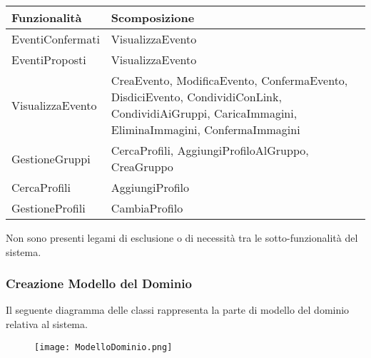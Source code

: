 \begin{tabular} {|P{7.3cm}|P{8cm}|}
    \hline
    \textbf{Funzionalità} & \textbf{Scomposizione}                                                                                                                            \\
    \hline
    EventiConfermati      & VisualizzaEvento                                                                                                                                  \\
    \hline
    EventiProposti        & VisualizzaEvento                                                                                                                                  \\
    \hline
    VisualizzaEvento      & CreaEvento, ModificaEvento, ConfermaEvento, DisdiciEvento, CondividiConLink, CondividiAiGruppi, CaricaImmagini, EliminaImmagini, ConfermaImmagini \\
    \hline
    GestioneGruppi        & CercaProfili, AggiungiProfiloAlGruppo, CreaGruppo                                                                                                 \\
    \hline
    CercaProfili          & AggiungiProfilo                                                                                                                                   \\
    \hline
    GestioneProfili       & CambiaProfilo                                                                                                                                     \\
    \hline
\end{tabular}
\hfill \break

Non sono presenti legami di esclusione o di necessità tra le sotto-funzionalità del sistema.

\newpage
\subsubsection{Creazione Modello del Dominio}

Il seguente diagramma delle classi rappresenta la parte di modello del dominio relativa al sistema. \\

\begin{figure}[h!]
    \begin{center}
        \texttt{[image: ModelloDominio.png]}
    \end{center}
\end{figure}
\hfill \break

